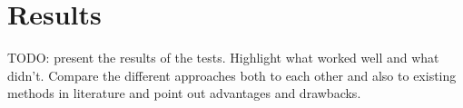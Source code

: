 \chapter{Results}
\label{chapter:results}
TODO: present the results of the tests. Highlight what worked well and what didn't. Compare the different approaches both to each other and also to existing methods in literature and point out advantages and drawbacks.

